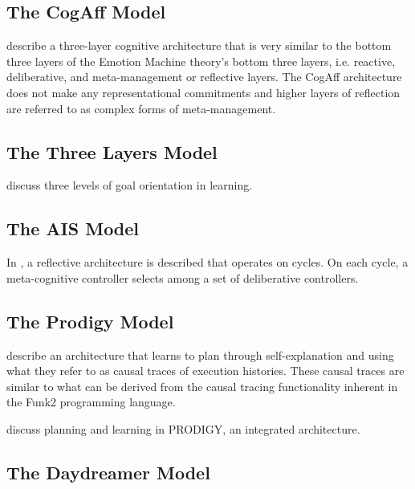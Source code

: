 \subsection{The CogAff Model}

\cite{sloman:2001} describe a three-layer cognitive architecture that is very similar to the bottom three layers of the Emotion Machine theory's bottom three layers, i.e. reactive, deliberative, and meta-management or reflective layers.
The CogAff architecture does not make any representational commitments and higher layers of reflection are referred to as complex forms of meta-management.

\subsection{The Three Layers Model}

\cite{ngbereiter:1995} discuss three levels of goal orientation in learning.

\subsection{The AIS Model}

In \cite{hayesroth:1995}, a reflective architecture is described that operates on cycles.
On each cycle, a meta-cognitive controller selects among a set of deliberative controllers.

\subsection{The Prodigy Model}

\cite{carbonell:1991} describe an architecture that learns to plan through self-explanation and using what they refer to as causal traces of execution histories.
These causal traces are similar to what can be derived from the causal tracing functionality inherent in the Funk2 programming language.

\cite{carbonell:1995} discuss planning and learning in PRODIGY, an integrated architecture.

\subsection{The Daydreamer Model}


\cite{mueller:1990}
























































